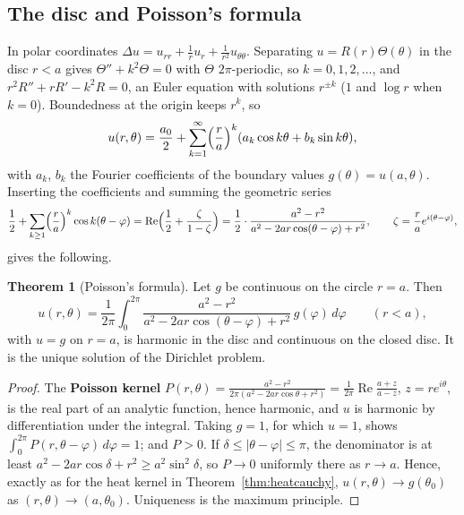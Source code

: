 \documentclass[11pt,a4paper]{article}
\numberwithin{equation}{section}
\theoremstyle{definition}
\newtheorem{thm}{Theorem}[subsection]
\begin{document}
\subsection{The disc and Poisson's formula}
\label{ssec:poissonformula}

In polar coordinates $\Delta u = u_{rr} + \frac1ru_r + \frac1{r^2}u_{\theta\theta}$. Separating $u = R(r)\Theta(\theta)$ in the disc $r < a$ gives $\Theta'' + k^2\Theta = 0$ with $\Theta$ $2\pi$-periodic, so $k = 0, 1, 2, \ldots$, and $r^2R'' + rR' - k^2R = 0$, an Euler equation with solutions $r^{\pm k}$ ($1$ and
$\log r$ when $k = 0$). Boundedness at the origin keeps $r^k$, so
\[
u(r, \theta) = \frac{a_0}2 + \sum_{k = 1}^\infty\Bigl(\frac ra\Bigr)^k(a_k\cos k\theta + b_k\sin k\theta) ,
\]
with $a_k$, $b_k$ the Fourier coefficients of the boundary values $g(\theta) = u(a, \theta)$. Inserting the coefficients and summing the geometric series
\[
\frac12 + \sum_{k \geq 1}\Bigl(\frac ra\Bigr)^k\cos k(\theta - \varphi) = \operatorname{Re}\Bigl(\frac12 + \frac{\zeta}{1 - \zeta}\Bigr) = \frac12\cdot\frac{a^2 - r^2}{a^2 - 2ar\cos(\theta - \varphi) + r^2}, \qquad \zeta = \frac rae^{i(\theta - \varphi)} ,
\]
gives the following.

\begin{thm}[Poisson's formula]
\label{thm:poissondisc}
Let $g$ be continuous on the circle $r = a$. Then
\[
u(r, \theta) = \frac1{2\pi}\int_0^{2\pi}\frac{a^2 - r^2}{a^2 - 2ar\cos(\theta - \varphi) + r^2}\,g(\varphi)\,d\varphi \qquad (r < a),
\]
with $u = g$ on $r = a$, is harmonic in the disc and continuous on the closed disc. It is the unique solution of the Dirichlet problem.
\end{thm}

\begin{proof}
The \textbf{Poisson kernel} $P(r, \theta) = \frac{a^2 - r^2}{2\pi(a^2 - 2ar\cos\theta + r^2)} = \frac1{2\pi}\operatorname{Re}\frac{a + z}{a - z}$, $z = re^{i\theta}$, is the real part of an analytic function, hence harmonic, and $u$ is harmonic by differentiation under the integral. Taking $g = 1$, for which $u = 1$, shows
$\int_0^{2\pi}P(r, \theta - \varphi)\,d\varphi = 1$; and $P > 0$. If $\delta \leq |\theta - \varphi| \leq \pi$, the denominator is at least $a^2 - 2ar\cos\delta + r^2 \geq a^2\sin^2\delta$, so $P \to 0$ uniformly there as $r \to a$. Hence, exactly as for the heat kernel in Theorem~\ref{thm:heatcauchy},
$u(r, \theta) \to g(\theta_0)$ as $(r, \theta) \to (a, \theta_0)$. Uniqueness is the maximum principle.
\end{proof}
\end{document}
